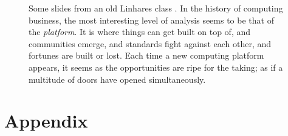 \begin{figure}[!p]

\caption{Some slides from an old Linhares class \citet{only-one-life}.  In the history of computing business, the most interesting level of analysis seems to be that of the \emph{platform}.  It is where things can get built on top of, and communities emerge, and standards fight against each other, and fortunes are built or lost.  Each time a new computing platform appears, it seems as the opportunities are ripe for the taking; as if a multitude of doors have opened simultaneously.
\label{fig:one-life}}
\end{figure}









\chapter{Appendix}

%
